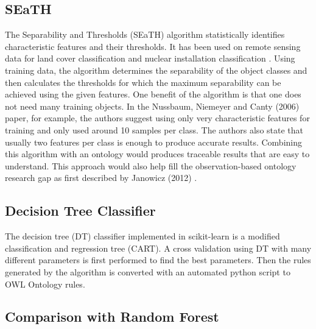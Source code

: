 \documentclass[authoryear, review,12pt,number]{elsarticle}
\begin{document}
\subsection{SEaTH} The Separability and Thresholds (SEaTH) algorithm
\citep{Nussbaum2006} statistically identifies characteristic features and their thresholds. It has
been used on remote sensing data for land cover classification \citep{Gao2011}
and nuclear installation classification \citep{Nussbaum2006}.
Using training data, the algorithm determines the separability of the object
classes and then calculates the thresholds for which the maximum separability
can be achieved using the given features. One benefit of the algorithm is that
one does not need many training objects.
In the Nussbaum, Niemeyer and Canty (2006) paper, for example, the authors
suggest using only very characteristic features for training and only used
around 10 samples per class\citep{Nussbaum2006}. The authors also state that
usually two features per class is enough to produce accurate results. Combining
this algorithm with an ontology would produces traceable results that are easy
to understand. This approach would also help fill the observation-based ontology
research gap as first described by Janowicz (2012) \citep{Janowicz2012}.

\subsection{Decision Tree Classifier}
The decision tree (DT) classifier implemented in scikit-learn is a modified
classification and regression tree (CART)\citep{scikit-learn}. A cross
validation using DT with many different parameters is first performed to find the best
parameters. Then the rules generated by the algorithm is converted with an
automated python script to OWL Ontology rules.

\subsection{Comparison with Random Forest}
\end{document}
